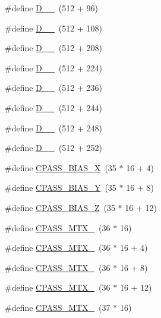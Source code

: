 \begin{DoxyCompactItemize}
\item 
\#define \hyperlink{group___d_r_i_v_e_r_s_ga36e10f13d70b3d8e038d39d807587202}{D\+\_\+\_}~(512 + 96)
\item 
\#define \hyperlink{group___d_r_i_v_e_r_s_ga09ccdf661a9ab9f8df8f2c7070d0dff9}{D\+\_\+\_}~(512 + 108)
\item 
\#define \hyperlink{group___d_r_i_v_e_r_s_gae2175af550784283fee34f3e67ba9c35}{D\+\_\+\_}~(512 + 208)
\item 
\#define \hyperlink{group___d_r_i_v_e_r_s_ga08f00bcef1e8814906c2354dc8b9e8b8}{D\+\_\+\_}~(512 + 224)
\item 
\#define \hyperlink{group___d_r_i_v_e_r_s_gafe0c8ed2924052fe714ec9174389bbe0}{D\+\_\+\_}~(512 + 236)
\item 
\#define \hyperlink{group___d_r_i_v_e_r_s_gaf53e9ad71a55861be572b74497681bb1}{D\+\_\+\_}~(512 + 244)
\item 
\#define \hyperlink{group___d_r_i_v_e_r_s_gab8953d8cd2c2dbeea3cc33ee50d0e3e1}{D\+\_\+\_}~(512 + 248)
\item 
\#define \hyperlink{group___d_r_i_v_e_r_s_ga94327b4d894185063c5104a02d9714ee}{D\+\_\+\_}~(512 + 252)
\item 
\#define \hyperlink{group___d_r_i_v_e_r_s_gaaf010f875dd67b0107be3e9fa31b3e27}{C\+P\+A\+S\+S\+\_\+\+B\+I\+A\+S\+\_\+X}~(35 $\ast$ 16 + 4)
\item 
\#define \hyperlink{group___d_r_i_v_e_r_s_ga6d24a81ab42b7fa4eb8139de1f61dabd}{C\+P\+A\+S\+S\+\_\+\+B\+I\+A\+S\+\_\+Y}~(35 $\ast$ 16 + 8)
\item 
\#define \hyperlink{group___d_r_i_v_e_r_s_gab931596f83f81d20cb6f79b99a6d71c7}{C\+P\+A\+S\+S\+\_\+\+B\+I\+A\+S\+\_\+Z}~(35 $\ast$ 16 + 12)
\item 
\#define \hyperlink{group___d_r_i_v_e_r_s_ga6a6966c355589a06d8fb29efaff9902f}{C\+P\+A\+S\+S\+\_\+\+M\+T\+X\+\_}~(36 $\ast$ 16)
\item 
\#define \hyperlink{group___d_r_i_v_e_r_s_gaf0c24262e6d095fbd0b259111221d22f}{C\+P\+A\+S\+S\+\_\+\+M\+T\+X\+\_}~(36 $\ast$ 16 + 4)
\item 
\#define \hyperlink{group___d_r_i_v_e_r_s_gac5f1350e9764b47bad1e5338e1f42e42}{C\+P\+A\+S\+S\+\_\+\+M\+T\+X\+\_}~(36 $\ast$ 16 + 8)
\item 
\#define \hyperlink{group___d_r_i_v_e_r_s_ga345d7d640ac1340e3eaf23c4efc9cd80}{C\+P\+A\+S\+S\+\_\+\+M\+T\+X\+\_}~(36 $\ast$ 16 + 12)
\item 
\#define \hyperlink{group___d_r_i_v_e_r_s_gad6a7e3d40cf198dd69e7d3caeefc8453}{C\+P\+A\+S\+S\+\_\+\+M\+T\+X\+\_}~(37 $\ast$ 16)

\end{DoxyCompactItemize}
